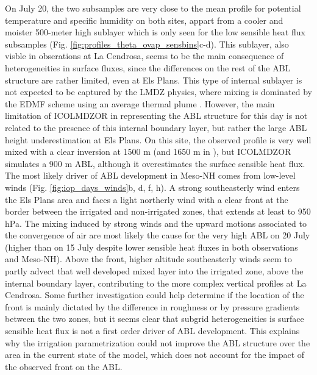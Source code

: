 On July 20, the two subsamples are very close to the mean profile for potential temperature and specific humidity on both sites, appart from a cooler and moister 500-meter high sublayer which is only seen for the low sensible heat flux subsamples (Fig. \ref{fig:profiles_theta_ovap_sensbins}c-d). This sublayer, also visble in obserations at La Cendrosa, seems to be the main consequence of heterogeneities in surface fluxes, since the differences on the rest of the ABL structure are rather limited, even at Els Plans.
This type of internal sublayer is not expected to be captured by the LMDZ physics, where mixing is dominated by the EDMF scheme using an average thermal plume \citep{rio_thermal_2008}. 
However, the main limitation of ICOLMDZOR in representing the ABL structure for this day is not related to the presence of this internal boundary layer, but rather the large ABL height underestimation at Els Plans.
On this site, the observed profile is very well mixed with a clear inversion at 1500 m (and 1650 m in \mesoexact), but ICOLMDZOR simulates a 900 m ABL, although it overestimates the surface sensible heat flux.
The most likely driver of ABL development in Meso-NH comes from low-level winds (Fig. \ref{fig:iop_days_winds}b, d, f, h). A strong southeasterly wind  enters the Els Plans area and faces a light northerly wind with a clear front at the border between the irrigated and non-irrigated zones, that extends at least to 950 hPa.
The mixing induced by strong winds and the upward motions associated to the convergence of air are most likely the cause for the very high ABL on 20 July (higher than on 15 July despite lower sensible heat fluxes in both observations and Meso-NH). 
Above the front, higher altitude southeasterly winds seem to partly advect that well developed mixed layer into the irrigated zone, above the internal boundary layer, contributing to the more complex vertical profiles at La Cendrosa.
Some further investigation could help determine if the location of the front is mainly dictated by the difference in roughness or by pressure gradients between the two zones, but it seems clear that subgrid heterogeneities is surface sensible heat flux is not a first order driver of ABL development.
This explains why the irrigation parametrization could not improve the ABL structure over the area in the current state of the model, which does not account for the impact of the observed front on the ABL.

